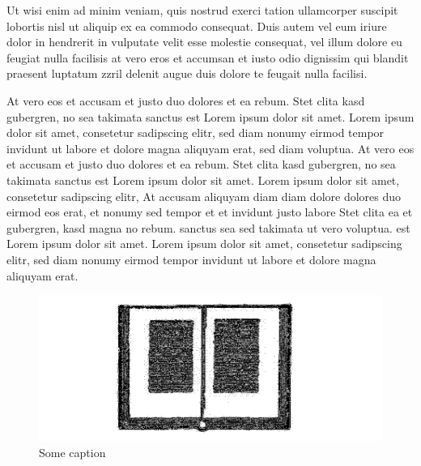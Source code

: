 Ut wisi enim ad minim veniam, quis nostrud exerci tation ullamcorper suscipit lobortis nisl ut aliquip ex ea commodo consequat. Duis autem vel eum iriure dolor in hendrerit in vulputate velit esse molestie consequat, vel illum dolore eu feugiat nulla facilisis at vero eros et accumsan et iusto odio dignissim qui blandit praesent luptatum zzril delenit augue duis dolore te feugait nulla facilisi. 

At vero eos et accusam et justo duo dolores et ea rebum. Stet clita kasd gubergren, no sea takimata sanctus est Lorem ipsum dolor sit amet. Lorem ipsum dolor sit amet, consetetur sadipscing elitr, sed diam nonumy eirmod tempor invidunt ut labore et dolore magna aliquyam erat, sed diam voluptua. At vero eos et accusam et justo duo dolores et ea rebum. Stet clita kasd gubergren, no sea takimata sanctus est Lorem ipsum dolor sit amet. Lorem ipsum dolor sit amet, consetetur sadipscing elitr, At accusam aliquyam diam diam dolore dolores duo eirmod eos erat, et nonumy sed tempor et et invidunt justo labore Stet clita ea et gubergren, kasd magna no rebum. sanctus sea sed takimata ut vero voluptua. est Lorem ipsum dolor sit amet. Lorem ipsum dolor sit amet, consetetur sadipscing elitr, sed diam nonumy eirmod tempor invidunt ut labore et dolore magna aliquyam erat. 






\begin{figure}
\includegraphics[height=.3\textheight]{figures/samplefigure.png}
\caption{Some caption}

\end{figure}